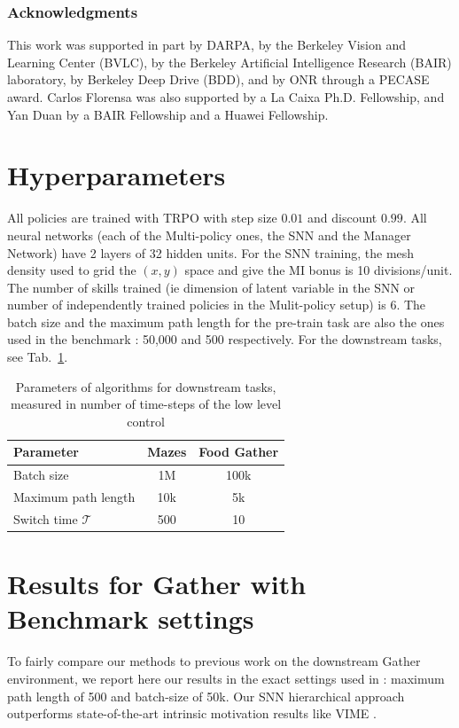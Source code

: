 \documentclass{article} %
\begin{document}
\subsubsection*{Acknowledgments}
This work was supported in part by DARPA, by the Berkeley Vision and Learning Center (BVLC), by the Berkeley Artificial Intelligence Research (BAIR) laboratory, by Berkeley Deep Drive (BDD), and by ONR through a PECASE award. Carlos Florensa was also supported by a La Caixa Ph.D. Fellowship, and Yan Duan by a BAIR Fellowship and a Huawei Fellowship.




\appendix
\section{Hyperparameters}
\label{sec:hyper}
All policies are trained with TRPO with step size $0.01$ and discount $0.99$. All neural networks (each of the Multi-policy ones, the SNN and the Manager Network) have 2 layers of 32 hidden units. For the SNN training, the mesh density used to grid the $(x, y)$ space and give the MI bonus is 10 divisions/unit. The number of skills trained (ie dimension of latent variable in the SNN or number of independently trained policies in the Mulit-policy setup) is 6. The batch size and the maximum path length for the pre-train task are also the ones used in the benchmark \citep{duan2016benchmarking}: 50,000 and 500 respectively. For the downstream tasks, see Tab.\ \ref{tab:params}.

\begin{table}[h!]
\centering
\begin{tabular}[t]{l|c|c}
Parameter & Mazes & Food Gather \\
\hline
Batch size & 1M & 100k \\
Maximum path length & 10k & 5k \\
Switch time $\mathcal{T}$ & 500 & 10
\end{tabular}
\caption{Parameters of algorithms for downstream tasks, measured in number of time-steps of the low level control}
\label{tab:params}
\end{table}


\section{Results for Gather with Benchmark settings}
\label{sec:gather_compare}
To fairly compare our methods to previous work on the downstream Gather environment, we report here our results in the exact settings used in \citet{duan2016benchmarking}: maximum path length of 500 and batch-size of 50k. Our SNN hierarchical approach outperforms state-of-the-art intrinsic motivation results like VIME \citep{houthooft2016variational}.
\end{document}
